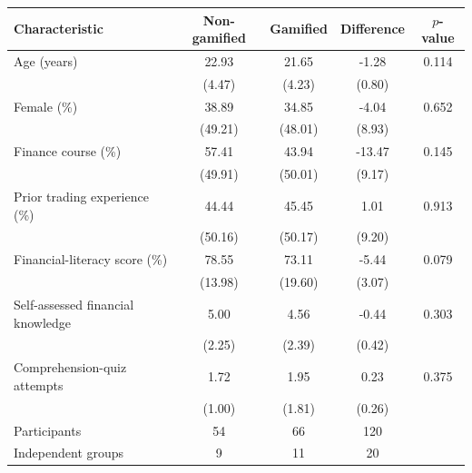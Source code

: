 \begin{tabular}{@{}lcccc@{}}
\midrule \midrule
Characteristic & Non-gamified & Gamified & Difference & $p$-value \\
\midrule
Age (years) & 22.93 & 21.65 & -1.28 & 0.114 \\
             & (4.47) & (4.23) & (0.80) & \\
Female (\%) & 38.89 & 34.85 & -4.04 & 0.652 \\
             & (49.21) & (48.01) & (8.93) & \\
Finance course (\%) & 57.41 & 43.94 & -13.47 & 0.145 \\
                     & (49.91) & (50.01) & (9.17) & \\
Prior trading experience (\%) & 44.44 & 45.45 & 1.01 & 0.913 \\
                               & (50.16) & (50.17) & (9.20) & \\
Financial-literacy score (\%) & 78.55 & 73.11 & -5.44 & 0.079 \\
                               & (13.98) & (19.60) & (3.07) & \\
Self-assessed financial knowledge & 5.00 & 4.56 & -0.44 & 0.303 \\
                                     & (2.25) & (2.39) & (0.42) & \\
Comprehension-quiz attempts & 1.72 & 1.95 & 0.23 & 0.375 \\
                             & (1.00) & (1.81) & (0.26) & \\
\midrule
Participants & 54 & 66 & 120 & \\
Independent groups & 9 & 11 & 20 & \\
\midrule \midrule
\end{tabular}

